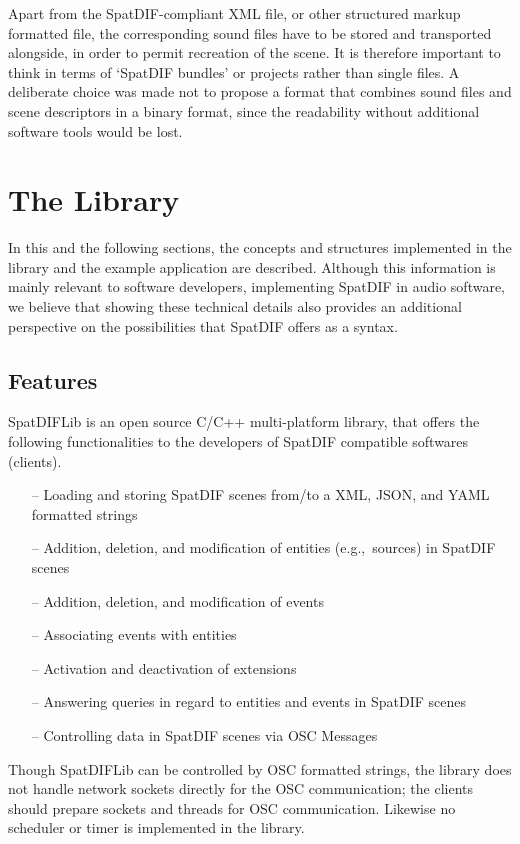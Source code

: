 \documentclass[a4paper]{article}
\begin{document}
Apart from the SpatDIF-compliant XML file, or other structured markup formatted file, the corresponding sound files have to be stored and transported alongside, in order to permit recreation of the scene.
It is therefore important to think in terms of `SpatDIF bundles' or projects rather than single files.
A deliberate choice was made not to propose a format that combines sound files and scene descriptors in a binary format, since the readability without additional software tools would be lost.

\section{The Library} %

In this and the following sections, the concepts and structures implemented in the library and the example application are described.
Although this information is mainly relevant to software developers, implementing SpatDIF in audio software, we believe that showing these technical details also provides an additional perspective on the possibilities that SpatDIF offers as a syntax.

\subsection{Features}
SpatDIFLib is an open source C/C++ multi-platform library, that offers the following functionalities to the developers of SpatDIF compatible softwares (clients).

\begin{itemize}[leftmargin=*]
\item[--] Loading and storing SpatDIF scenes from/to a XML, JSON, and YAML formatted strings
\item[--] Addition, deletion, and modification of entities (e.g.,~sources) in SpatDIF scenes 
\item[--] Addition, deletion, and modification of events
\item[--] Associating events with entities
\item[--] Activation and deactivation of extensions
\item[--] Answering queries in regard to entities and events in SpatDIF scenes
\item[--] Controlling data in SpatDIF scenes via OSC Messages
\end{itemize}

Though SpatDIFLib can be controlled by OSC \cite{Wessel_2002, Schmeder_2008} formatted strings, the library does not handle network sockets directly for the OSC communication; the clients should prepare sockets and threads for OSC communication. Likewise no scheduler or timer is implemented in the library. 
  
\end{document}
